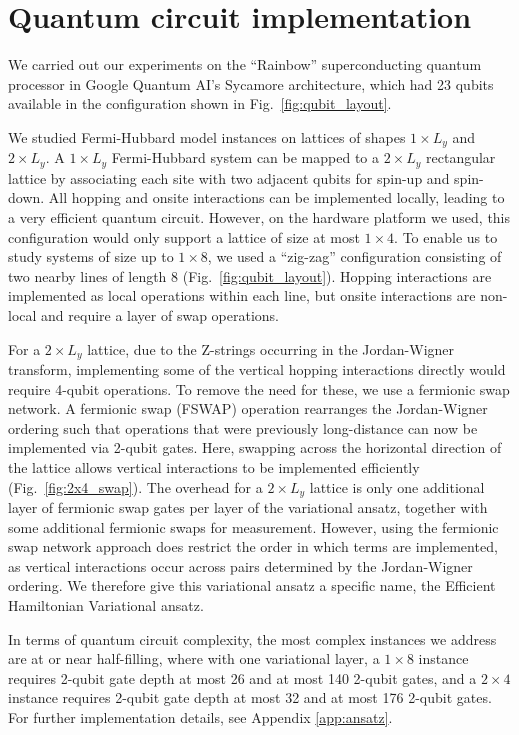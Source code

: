 \documentclass[aps,prb,twoside,superscriptaddress,longbibliography,nofootinbib,floatfix, notitlepage,twocolumn]{revtex4-1}
\begin{document}
\section{Quantum circuit implementation}

We carried out our experiments on the ``Rainbow'' superconducting quantum processor in Google Quantum AI's Sycamore architecture, which had 23 qubits available in the configuration shown in Fig.\ \ref{fig:qubit_layout}.

We studied Fermi-Hubbard model instances on lattices of shapes $1\times L_y$ and $2\times L_y$. 
A $1 \times L_y$ Fermi-Hubbard system can be mapped to a $2 \times L_y$ rectangular lattice by associating each site with two adjacent qubits for spin-up and spin-down. All hopping and onsite interactions can be implemented locally, leading to a very efficient quantum circuit. However, on the hardware platform we used, this configuration would only support a lattice of size at most $1 \times 4$. To enable us to study systems of size up to $1 \times 8$, we used a ``zig-zag'' configuration consisting of two nearby lines of length 8 (Fig.\ \ref{fig:qubit_layout}). Hopping interactions are implemented as local operations within each line, but onsite interactions are non-local and require a layer of swap operations.

For a $2 \times L_y$ lattice, due to the Z-strings occurring in the Jordan-Wigner transform, implementing some of the vertical hopping interactions directly would require 4-qubit operations. To remove the need for these, we use a fermionic swap network\cite{kivlichan18}. A fermionic swap (FSWAP) operation rearranges the Jordan-Wigner ordering such that operations that were previously long-distance can now be implemented via 2-qubit gates. Here, swapping across the horizontal direction of the lattice allows vertical interactions to be implemented efficiently (Fig.\ \ref{fig:2x4_swap}). The overhead for a $2\times L_y$ lattice is only one additional layer of fermionic swap gates per layer of the variational ansatz, together with some additional fermionic swaps for measurement. However, using the fermionic swap network approach does restrict the order in which terms are implemented, as vertical interactions occur across pairs determined by the Jordan-Wigner ordering. We therefore give this variational ansatz a specific name, the Efficient Hamiltonian Variational ansatz\cite{cade20}.

In terms of quantum circuit complexity, the most complex instances we address are at or near half-filling, where with one variational layer, a $1\times 8$ instance requires 2-qubit gate depth at most 26 and at most 140 2-qubit gates, and a $2 \times 4$ instance requires 2-qubit gate depth at most 32 and at most 176 2-qubit gates. For further implementation details, see Appendix \ref{app:ansatz}.
\end{document}
